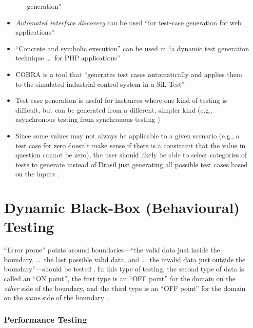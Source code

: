 \begin{itemize}
\begin{itemize}
                    generation'' \citep[p.~345]{LahiriEtAl2013}
          \end{itemize}
    \item \emph{Automated interface discovery} can be used ``for test-case
          generation for web applications'' \citep[p.~184]{DoğanEtAl2014}
    \item ``Concrete and symbolic execution'' can be used in ``a dynamic test
          generation technique \dots\ for PHP applications''
          \citep[p.~192]{DoğanEtAl2014} 
    \item COBRA is a tool that ``generates test cases automatically and
          applies them to the simulated industrial control system in a SiL
          Test'' \citep[p.~2]{PreußeEtAl2012}
    \item Test case generation is useful for instances where one kind of
          testing is difficult, but can be generated from a different,
          simpler kind (e.g., asynchronous testing from synchronous testing
          \citep{JardEtAl1999})
    \item Since some values may not always be applicable to a given scenario
          (e.g., a test case for zero doesn't make sense if there is a
          constraint that the value in question cannot be zero), the user
          should likely be able to select categories of tests to generate
          instead of Drasil just generating all possible test cases based on
          the inputs \citep{june_11_meeting}.
\end{itemize}

\section[Dynamic Black-Box (Behavioural) Testing]{Dynamic Black-Box
  (Behavioural) Testing \citep[pp.~64-65]{Patton2006}}

``Error prone'' points around boundaries---``the valid data just inside the
boundary, \dots\ the last possible valid data, and \dots\ the invalid data
just outside the boundary''\citep[p.~73]{Patton2006}---should be tested
\citep[p.~430]{vanVliet2000}. In this type of testing, the second type of
data is called an ``ON point'', the first type is an ``OFF point'' for the
domain on the \emph{other} side of the boundary, and the third type is an ``OFF
point'' for the domain on the \emph{same} side of the boundary
\citep[p.~430]{vanVliet2000}.

\subsubsection{Performance Testing}

